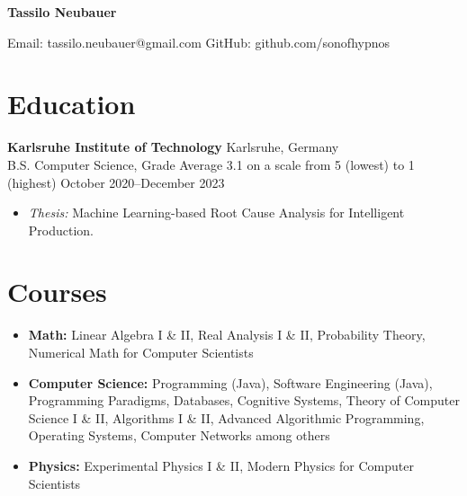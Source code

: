 \documentclass[letterpaper,9pt]{article}
\begin{document}
\begin{center}
\Huge\textbf{Tassilo Neubauer}

\vspace{0.5em}
\large
\textcolor{accent}{Email:} tassilo.neubauer@gmail.com \hspace{2em}
\textcolor{accent}{GitHub:} github.com/sonofhypnos
\end{center}

\section*{Education}
\textbf{Karlsruhe Institute of Technology} \hfill Karlsruhe, Germany \\
B.S. Computer Science, Grade Average 3.1 on a scale from 5 (lowest) to 1 (highest) \hfill October 2020--December 2023
\begin{itemize}
    \item \textit{Thesis:} Machine Learning-based Root Cause Analysis for Intelligent Production.
\end{itemize}

\section*{Courses}
\begin{itemize}
    \item \textbf{Math:} Linear Algebra I \& II, Real Analysis I \& II, Probability Theory, Numerical Math for Computer Scientists
    \item \textbf{Computer Science:} Programming (Java), Software Engineering (Java), Programming Paradigms, Databases, Cognitive Systems, Theory of Computer Science I \& II, Algorithms I \& II, Advanced Algorithmic Programming, Operating Systems, Computer Networks among others
    \item \textbf{Physics:} Experimental Physics I \& II, Modern Physics for Computer Scientists
\end{itemize}
\end{document}
